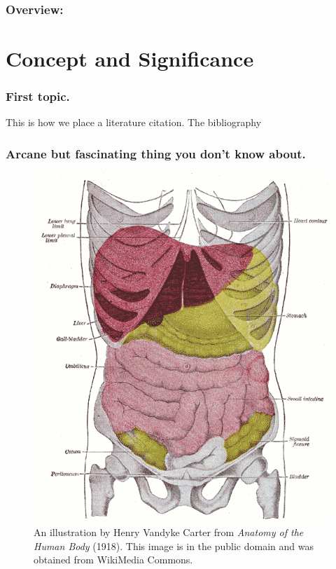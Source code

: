 \documentclass[12pt]{article}
\begin{document}








\subsubsection * {Overview:} \lipsum[2]


\section {Concept and Significance}


\subsubsection * {First topic.}

This is how we place a literature citation\cite{Dayhoff:1983}.
The bibliography 
\lipsum[1]



\subsubsection * {Arcane but fascinating thing you don't know about.}

\lipsum[60-62]

\begin{figure}
	\centering
	\includegraphics[width=.4\textwidth]{Gray1224}
	\caption{
	An illustration by Henry Vandyke Carter from \textit{Anatomy of the Human Body} (1918).
	This image is in the public domain and was obtained from WikiMedia Commons.}
\label{fig:model}
\end{figure}
\end{document}
